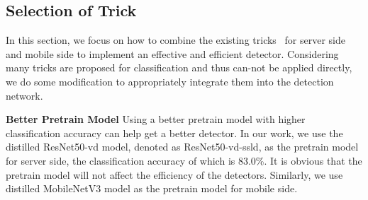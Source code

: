 \documentclass[10pt,twocolumn,letterpaper]{article}
\begin{document}
    \begin{table*}
    \begin{center}
    \end{center}
    \caption{The ablation study of tricks on the MS COCO test-dev for mobile side on Kirin 990 ARM CPU .}
    \label{table2}
    \end{table*}

	
	\subsection{Selection of Trick}
In this section, we focus on how to combine the existing tricks~\cite{lawrance1977exponential,yun2019cutmix} for server side and mobile side to implement an effective and efficient detector.
Considering many tricks are proposed for classification and thus can-not be applied directly, we do some modification to appropriately integrate them into the detection network.
    
{\bf Better Pretrain Model} Using a better pretrain model with higher classification accuracy can help get a better detector. In our work, we use the distilled ResNet50-vd model, denoted as ResNet50-vd-ssld, as the pretrain model for server side, the classification accuracy of which is 83.0\%. It is obvious that the pretrain model will not affect the efficiency of the detectors. Similarly, we use distilled MobileNetV3 model as the pretrain model for mobile side. 
\end{document}
